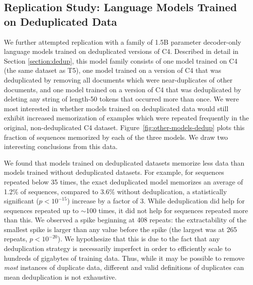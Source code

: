 \subsection{Replication Study: Language Models Trained on Deduplicated Data}

We further attempted replication with a family of 1.5B parameter decoder-only language models trained on deduplicated versions of C4.
Described in detail in Section \ref{section:dedup}, this model family consists of one model trained on C4 (the same dataset as T5), one model trained on a version of C4 that was deduplicated by removing all documents which were near-duplicates of other documents, and one model trained on a version of C4 that was deduplicated by deleting any string of length-50 tokens that occurred more than once.
We were most interested in whether models trained on deduplicated data would still exhibit increased memorization of examples which were repeated frequently in the original, non-deduplicated C4 dataset.
%
Figure~\ref{fig:other-models-dedup} plots this fraction of sequences memorized by each of the three models.
%
We draw two interesting conclusions from this data.


We found that models trained on deduplicated datasets memorize less data than models trained without deduplicated datasets.
%
For example, for sequences repeated below 35 times, the exact deduplicated model memorizes an average of 1.2\% of sequences, compared to 3.6\% without deduplication, a statistically significant ($p<10^{-15}$) increase by a factor of 3. 
While deduplication did help for sequences repeated up to $\sim$100 times,
it did not help for sequences repeated more than this.
%
We observed a spike beginning at 408 repeats: the extractability of the smallest spike is larger than any value before the spike (the largest was at 265 repeats, $p<10^{-20}$).
%
We hypothesize that this is due to the fact that any deduplication strategy is necessarily
imperfect in order to efficiently scale to hundreds of gigabytes of training data.
%
Thus, while it may be possible to remove \emph{most} instances of duplicate data, different and valid definitions of duplicates can mean deduplication is not exhaustive.


